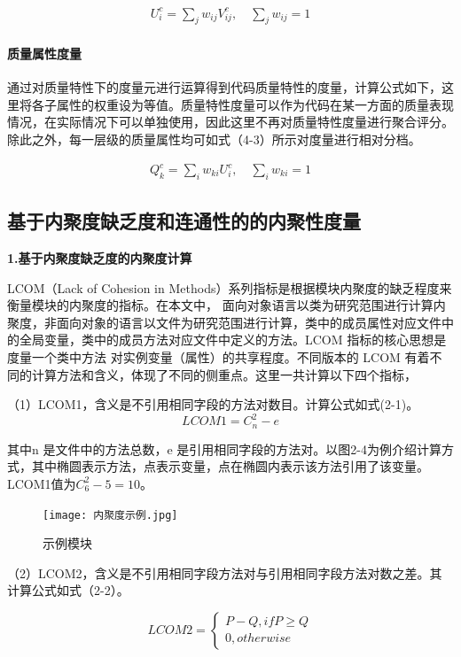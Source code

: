\begin{align}
U_i^c = \sum_j w_{ij} V_{ij}^c, \quad \sum_j w_{ij} = 1
\end{align}

\paragraph{质量属性度量} 通过对质量特性下的度量元进行运算得到代码质量特性的度量，计算公式如下，这里将各子属性的权重设为等值。质量特性度量可以作为代码在某一方面的质量表现情况，在实际情况下可以单独使用，因此这里不再对质量特性度量进行聚合评分。除此之外，每一层级的质量属性均可如式（4-3）所示对度量进行相对分档。

\begin{align}
Q_k^c = \sum_i w_{ki} U_{i}^c, \quad \sum_i w_{ki} = 1
\end{align}

\subsection{基于内聚度缺乏度和连通性的的内聚性度量}

\noindent \textbf{1.基于内聚度缺乏度的内聚度计算}

 LCOM（Lack of Cohesion in Methods）系列指标是根据模块内聚度的缺乏程度来衡量模块的内聚度的指标。在本文中，
面向对象语言以类为研究范围进行计算内聚度，非面向对象的语言以文件为研究范围进行计算，类中的成员属性对应文件中的全局变量，类中的成员方法对应文件中定义的方法。LCOM 指标的核心思想是度量一个类中方法
对实例变量（属性）的共享程度。不同版本的 LCOM 有着不同的计算方法和含义，体现了不同的侧重点。这里一共计算以下四个指标，

（1）LCOM1，含义是不引用相同字段的方法对数目\cite{1994Ametr}。计算公式如式(2-1)。
\begin{equation}
LCOM1 = C_{n}^{2}-e
\end{equation}

其中n 是文件中的方法总数，e 是引用相同字段的方法对。以图2-4为例介绍计算方式，其中椭圆表示方法，点表示变量，点在椭圆内表示该方法引用了该变量。LCOM1值为\(C_{6}^{2} - 5 = 10\)。

\begin{figure}[h]
\centering
\texttt{[image: 内聚度示例.jpg]}
\caption{示例模块}
\end{figure}
    

（2）LCOM2，含义是不引用相同字段方法对与引用相同字段方法对数之差\cite{1996Coupling}。其计算公式如式（2-2）。

\begin{equation}
    {LCOM2}=\left\{
        \begin{array}
        {c}P-Q,  ifP\geq Q \\
        0,  otherwise
        \end{array}\right.
\end{equation}

